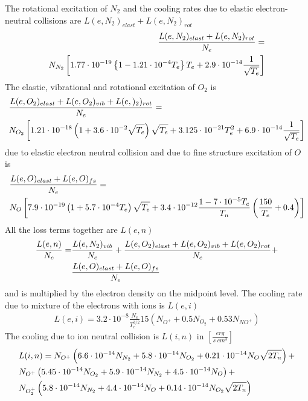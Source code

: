 The rotational excitation of $N_2$ and the cooling rates due to elastic electron-neutral
collisions are $L(e,N_2)_{elast}+ L(e,N_2)_{rot}$
%
\begin{align}
\frac{L(e,N_2)_{elast}+ L(e,N_2)_{rot}}{N_e} = \notag \\
  N_{N_2} \left[ 1.77 \cdot 10^{-19}
   \left\{ 1-1.21\cdot 10^{-4} T_e\right\} T_e + 2.9 \cdot 10^{-14} \frac{1}{\sqrt{T_e}} \right]
\end{align}
%
The elastic, vibrational and rotational excitation of $O_2$ is
%
\begin{align}
 {} &  \frac{L(e,O_2)_{elast}+ L(e,O_2)_{vib} +L(e,)_2)_{rot}}{N_e} =  \\
 {} &  N_{O_2}\left[ 1.21 \cdot 10^{-18} \left(
     1 + 3.6 \cdot 10^{-2} \sqrt{T_e}\right) \sqrt{T_e} + 3.125 \cdot 10^{-21} T_e^2 +
     6.9 \cdot 10^{-14} \frac{1}{\sqrt{T_e}}\right] \notag
\end{align}
%
due to elastic electron neutral collision and due
to fine structure excitation of $O$ is
%
\begin{align}
  {} & \frac{L(e,O)_{elast}+ L(e,O)_{fs}}{N_e} = \\
  {} & N_{O}\left[ 7.9 \cdot 10^{-19} \left(
   1 + 5.7 \cdot 10^{-4} T_e\right) \sqrt{T_e}+ 3.4 \cdot 10^{-12}
   \frac{1-7\cdot 10^{-5} T_e}{T_n} \left( \frac{150}{T_e}+ 0.4 \right)
  \right] \notag
\end{align}
%
All the loss terms together are $L(e,n)$
%
\begin{align}
  \frac{L(e,n)}{N_e} = & \frac{L(e,N_2)_{vib}}{N_e} +
  \frac{L(e,O_2)_{elast}+ L(e,O_2)_{vib} + L(e,O_2)_{rot}}{N_e}  + \notag \\
  {} & \frac{L(e,O)_{elast}+ L(e,O)_{fs}}{N_e}
\end{align}
%
and is multiplied by the electron density on the midpoint level. The cooling rate
due to mixture of the electrons with ions is $L(e,i)$
%
\begin{align}
 L(e,i) = 3.2 \cdot 10^{-8} \frac{N_e}{T_e^{3/2}} 15
     \left( N_{O^+} + 0.5 N_{O_2}+ 0.53 N_{NO^+}\right)
\end{align}
%
The cooling due to ion neutral collision is $L(i,n)$ in $[\frac{erg}{s \; cm^3}]$
%
\begin{align}
  {} & L(i,n) = N_{O^+}\left( 6.6 \cdot 10^{-14}N_{N_2} + 5.8 \cdot 10^{-14} N_{O_2}+ 0.21 \cdot 10^{-14}N_O \sqrt{2 T_n}\right)+ \notag \\
  {} &     N_{O^+}\left( 5.45 \cdot 10^{-14}N_{O_2} + 5.9 \cdot 10^{-14} N_{N_2}+ 4.5 \cdot 10^{-14}N_O \right)+  \notag \\
  {} &     N_{O_2^+}\left(5.8 \cdot 10^{-14}N_{N_2} + 4.4 \cdot 10^{-14} N_{O}+ 0.14 \cdot 10^{-14}N_{O_2} \sqrt{2 T_n}\right)
\end{align}
